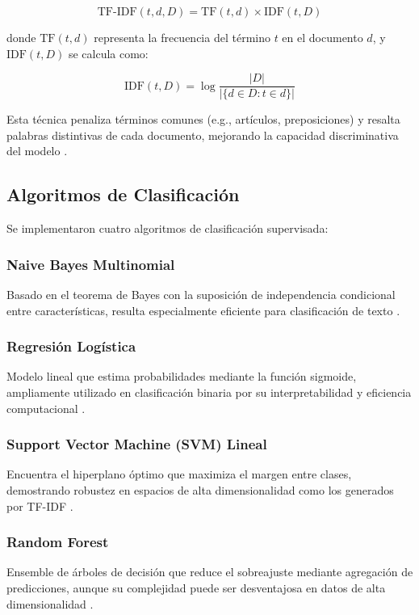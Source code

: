 \documentclass[12pt,a4paper]{article}
\begin{document}
\begin{equation}
\text{TF-IDF}(t,d,D) = \text{TF}(t,d) \times \text{IDF}(t,D)
\end{equation}

donde $\text{TF}(t,d)$ representa la frecuencia del término $t$ en el documento $d$, y $\text{IDF}(t,D)$ se calcula como:

\begin{equation}
\text{IDF}(t,D) = \log\frac{|D|}{|\{d \in D : t \in d\}|}
\end{equation}

Esta técnica penaliza términos comunes (e.g., artículos, preposiciones) y resalta palabras distintivas de cada documento, mejorando la capacidad discriminativa del modelo \cite{ramos2003}.

\subsection{Algoritmos de Clasificación}

Se implementaron cuatro algoritmos de clasificación supervisada:

\subsubsection{Naive Bayes Multinomial}
Basado en el teorema de Bayes con la suposición de independencia condicional entre características, resulta especialmente eficiente para clasificación de texto \cite{mccallum1998}.

\subsubsection{Regresión Logística}
Modelo lineal que estima probabilidades mediante la función sigmoide, ampliamente utilizado en clasificación binaria por su interpretabilidad y eficiencia computacional \cite{hosmer2013}.

\subsubsection{Support Vector Machine (SVM) Lineal}
Encuentra el hiperplano óptimo que maximiza el margen entre clases, demostrando robustez en espacios de alta dimensionalidad como los generados por TF-IDF \cite{joachims1998}.

\subsubsection{Random Forest}
Ensemble de árboles de decisión que reduce el sobreajuste mediante agregación de predicciones, aunque su complejidad puede ser desventajosa en datos de alta dimensionalidad \cite{breiman2001}.
\end{document}
